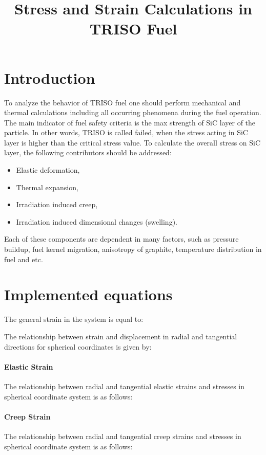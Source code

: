 \documentclass[review]{elsarticle}
\begin{document}
\begin{frontmatter}

\title{Stress and Strain Calculations in TRISO Fuel}

\end{frontmatter}


\section{Introduction} To analyze  the behavior of TRISO fuel one should perform mechanical and thermal calculations including all occurring phenomena during the fuel operation. The main indicator of fuel safety criteria is the max strength of SiC layer of the particle. In other words, TRISO is called failed, when the stress acting in SiC layer is higher than the critical stress value. To calculate the overall stress on SiC layer, the following contributors should be addressed: 
\begin{itemize}    
    \item Elastic deformation,
    \item Thermal expansion,
    \item Irradiation induced creep,
    \item Irradiation induced dimensional changes (swelling).
\end{itemize}
Each of these components are dependent in many factors, such as pressure buildup, fuel kernel migration, anisotropy of graphite, temperature distribution in fuel and etc.

\section{Implemented equations}
The general strain in the system is equal to:
\StrainGeneral

The relationship between strain and displacement in radial and tangential directions for spherical coordinates is given by:
\StrainAndDisplacement

\paragraph{Elastic Strain} The relationship between radial and tangential elastic strains and stresses in spherical coordinate system  is as follows:
\StrainElastic

\paragraph{Creep Strain} The relationship between radial and tangential creep strains and stresses in spherical coordinate system  is as follows: 
\StrainCreep
\end{document}
